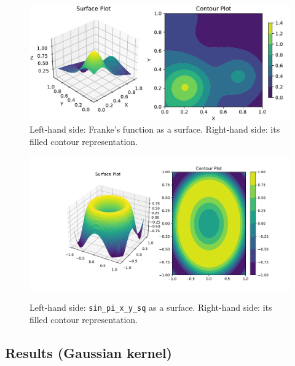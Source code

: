 \documentclass[12pt]{report} %
\begin{document}
\begin{figure}[ht]
  \includegraphics[width=\textwidth]{imagenes/experiments/2d/franke_interpolation/Franke_Function_Surface_Contour.pdf}
  \caption{Left-hand side: Franke's function as a surface. Right-hand side:
    its filled contour representation.}
  \label{fig:franke-function-surface-contour}
\end{figure}

\begin{figure}[ht]
  {\includegraphics[width=\textwidth, trim={3cm 0 1cm 0}, clip=true]{imagenes/experiments/2d/sin_pi_x_y_sq_interpolation/Sin_pi_x_y_sq_Contour.pdf}}
  \caption{Left-hand side: \texttt{sin\_pi\_x\_y\_sq} as a surface. Right-hand side:
    its filled contour representation.}
  \label{fig:sin-pi-x-y-sq-function-surface-contour}
\end{figure}


\subsection*{Results (Gaussian kernel)}
\end{document}
